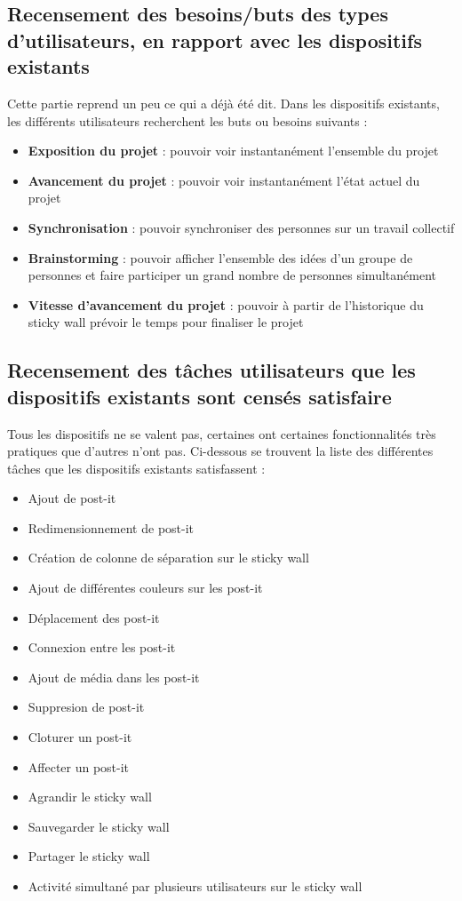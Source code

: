 \documentclass{article}
\begin{document}
\subsection{Recensement des besoins/buts des types d’utilisateurs, en rapport avec les dispositifs existants}
\hspace*{0.6cm}Cette partie reprend un peu ce qui a déjà été dit. Dans les dispositifs existants, les différents utilisateurs recherchent les buts ou besoins suivants :
\vspace{0.2cm}
\begin{itemize}
  \item \textbf{Exposition du projet} : pouvoir voir instantanément l'ensemble du projet
  \item \textbf{Avancement du projet} : pouvoir voir instantanément l'état actuel du projet
  \item \textbf{Synchronisation} : pouvoir synchroniser des personnes sur un travail collectif
  \item \textbf{Brainstorming} : pouvoir afficher l'ensemble des idées d'un groupe de personnes et faire participer un grand nombre de personnes simultanément
  \item \textbf{Vitesse d'avancement du projet} : pouvoir à partir de l'historique du sticky wall prévoir le temps pour finaliser le projet
\end{itemize}
\subsection{Recensement des tâches utilisateurs que les dispositifs existants sont censés satisfaire}
\hspace*{0.6cm}Tous les dispositifs ne se valent pas, certaines ont certaines fonctionnalités très pratiques que d'autres n'ont pas. Ci-dessous se trouvent la liste des différentes tâches que les dispositifs existants satisfassent :
\vspace{0.2cm}
\begin{itemize}
  \item Ajout de post-it
  \item Redimensionnement de post-it
  \item Création de colonne de séparation sur le sticky wall
  \item Ajout de différentes couleurs sur les post-it
  \item Déplacement des post-it
  \item Connexion entre les post-it
  \item Ajout de média dans les post-it
  \item Suppresion de post-it
  \item Cloturer un post-it
  \item Affecter un post-it
  \item Agrandir le sticky wall
  \item Sauvegarder le sticky wall
  \item Partager le sticky wall
  \item Activité simultané par plusieurs utilisateurs sur le sticky wall
\end{itemize}
\end{document}
